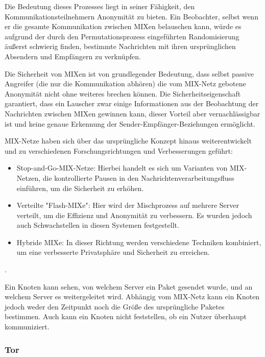 Die Bedeutung dieses Prozesses liegt in seiner Fähigkeit, den Kommunikationsteilnehmern Anonymität zu bieten. Ein Beobachter, selbst wenn er die gesamte Kommunikation zwischen MIXen belauschen kann, würde es aufgrund der durch den Permutationsprozess eingeführten Randomisierung äußerst schwierig finden, bestimmte Nachrichten mit ihren ursprünglichen Absendern und Empfängern zu verknüpfen.

Die Sicherheit von MIXen ist von grundlegender Bedeutung, dass selbst passive Angreifer (die nur die Kommunikation abhören) die vom MIX-Netz gebotene Anonymität nicht ohne weiteres brechen können. Die Sicherheitseigenschaft garantiert, dass ein Lauscher zwar einige Informationen aus der Beobachtung der Nachrichten zwischen MIXen gewinnen kann, dieser Vorteil aber vernachlässigbar ist und keine genaue Erkennung der Sender-Empfänger-Beziehungen ermöglicht.

MIX-Netze haben sich über das ursprüngliche Konzept hinaus weiterentwickelt und zu verschiedenen Forschungsrichtungen und Verbesserungen geführt:

\begin{itemize}

\item Stop-and-Go-MIX-Netze: Hierbei handelt es sich um Varianten von MIX-Netzen, die kontrollierte Pausen in den Nachrichtenverarbeitungsfluss einführen, um die Sicherheit zu erhöhen.

\item Verteilte "Flash-MIXe": Hier wird der Mischprozess auf mehrere Server verteilt, um die Effizienz und Anonymität zu verbessern. Es wurden jedoch auch Schwachstellen in diesen Systemen festgestellt.

\item Hybride MIXe: In dieser Richtung werden verschiedene Techniken kombiniert, um eine verbesserte Privatsphäre und Sicherheit zu erreichen\footnotemark{}.

\end{itemize}.

Ein Knoten kann sehen, von welchem Server ein Paket gesendet wurde, und an welchem Server es weitergeleitet wird. Abhängig vom MIX-Netz kann ein Knoten jedoch weder den Zeitpunkt noch die Größe des ursprüngliche Paketes bestimmen. Auch kann ein Knoten nicht feststellen, ob ein Nutzer überhaupt kommuniziert.

\subsubsection{Tor}

